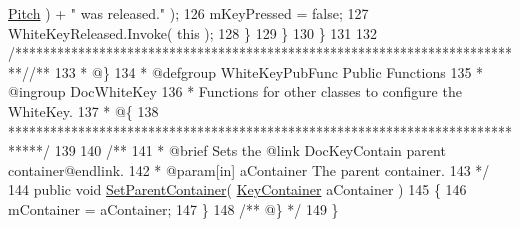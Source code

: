 \begin{DoxyCodeInclude}
      \hyperlink{group___white_key_pub_var_ga1ddd98b85ba069defc7cf47d25f625f4}{Pitch} ) + \textcolor{stringliteral}{" was released."} );
126                 mKeyPressed = \textcolor{keyword}{false};
127                 WhiteKeyReleased.Invoke( \textcolor{keyword}{this} );
128             \}
129         \}
130     \}
131 
132     \textcolor{comment}{/*************************************************************************/}\textcolor{comment}{/** }
133 \textcolor{comment}{     * @\}}
134 \textcolor{comment}{     * @defgroup WhiteKeyPubFunc Public Functions}
135 \textcolor{comment}{     * @ingroup DocWhiteKey}
136 \textcolor{comment}{     * Functions for other classes to configure the WhiteKey.}
137 \textcolor{comment}{     * @\{}
138 \textcolor{comment}{    *****************************************************************************/}
139 \textcolor{comment}{}
140 \textcolor{comment}{    /**}
141 \textcolor{comment}{     * @brief Sets the @link DocKeyContain parent container@endlink.}
142 \textcolor{comment}{     * @param[in] aContainer The parent container.}
143 \textcolor{comment}{    */}
144     \textcolor{keyword}{public} \textcolor{keywordtype}{void} \hyperlink{group___white_key_pub_func_gab926585e88db73a20431ac93d979b61d}{SetParentContainer}( \hyperlink{class_key_container}{KeyContainer} aContainer )
145     \{
146         mContainer = aContainer;
147     \}\textcolor{comment}{}
148 \textcolor{comment}{    /** @\} */}
149 \}
\end{DoxyCodeInclude}
 